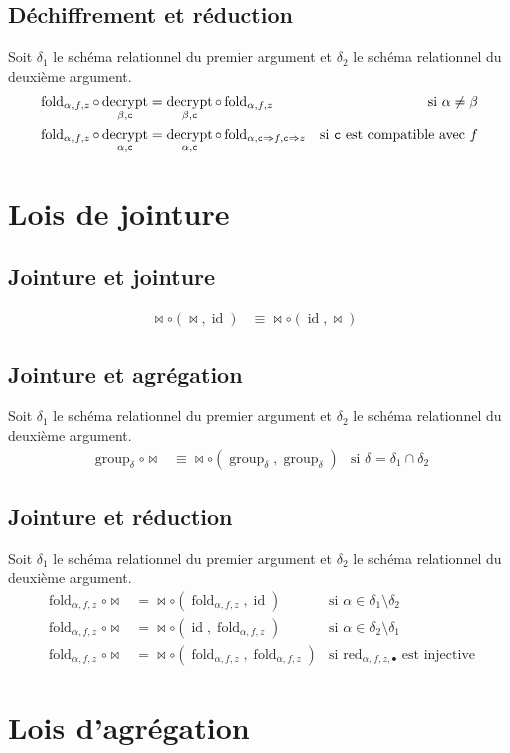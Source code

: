\documentclass[french]{article}
\DeclareMathOperator{\decrypt}{decrypt}
\DeclareMathOperator{\group}{group}
\DeclareMathOperator{\id}{id}
\DeclareMathOperator{\redu}{red}
\newcommand\typeT[1]{\text{\ttfamily #1}}
\newcommand{\decryptArgs}[2]{\decrypt_{#1 , \typeT{#2}}}
\newcommand{\decryptCAlpha}{\decryptArgs{\alpha}{c}}
\newcommand{\groupDelta}{\group_{\delta}}
\newcommand{\fold}[3]{\operatorname{fold}_{#1, #2, #3}}
\newcommand{\foldAlphafz}{\fold{\alpha}{f}{z}}
\newcommand{\args}{Soit $\delta_1$ le schéma relationnel du premier
	argument et $\delta_2$ le schéma relationnel du deuxième
	argument.}
\begin{document}
\subsection*{Déchiffrement et réduction}
\args
\begin{align}
\foldAlphafz \circ \decryptArgs{\beta}{c}
& = \decryptArgs{\beta}{c} \circ \foldAlphafz
& \text{si $\alpha \neq \beta$} \\
\foldAlphafz \circ \decryptCAlpha
& = \decryptCAlpha \circ \fold{\alpha}{\typeT{c} \Rightarrow f}{\typeT{c} \Rightarrow z}
& \text{si $\typeT{c}$ est compatible avec $f$}
\end{align}

\section*{Lois de jointure}
\subsection*{Jointure et jointure}
\begin{align}
\Join \circ (\Join, \id)
& \equiv \Join \circ (\id, \Join) &
\end{align}

\subsection*{Jointure et agrégation}
\args
\begin{align}
\groupDelta \circ \Join
& \equiv \Join \circ (\groupDelta, \groupDelta)
& \text{si $\delta = \delta_1 \cap \delta_2$}
\end{align}

\subsection*{Jointure et réduction}
\args
\begin{align}
\foldAlphafz \circ \Join
& = \Join \circ (\foldAlphafz, \id)
& \text{si $\alpha \in \delta_1 \setminus \delta_2$} \\
\foldAlphafz \circ \Join
& = \Join \circ (\id, \foldAlphafz)
& \text{si $\alpha \in \delta_2 \setminus \delta_1$} \\
\foldAlphafz \circ \Join
& = \Join \circ (\foldAlphafz, \foldAlphafz)
& \text{si $\redu_{\alpha, f, z, \bullet}$ est injective}
\end{align}

\section*{Lois d'agrégation}
\end{document}
